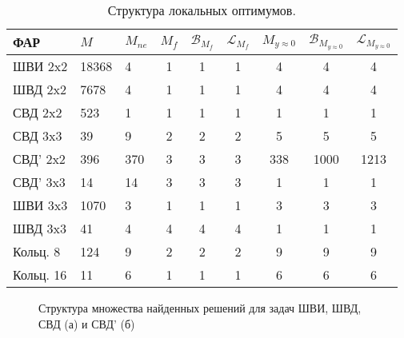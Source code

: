 \begin{table}[!h]
\centering
\begin{tabular}{|l | l l | c c c | c c c|}
    \hline
    \textbf{ФАР} & \textbf{$M$} & \textbf{$M_{ne}$} & \textbf{$M_{f}$} & \textbf{$\mathcal{B}_{M_f}$} & \textbf{$\mathcal{L}_{M_f}$} & \textbf{$M_{y\approx0}$} & \textbf{$\mathcal{B}_{M_{y\approx0}}$} & \textbf{$\mathcal{L}_{M_{y\approx0}}$}\\
    \hline
    ШВИ 2x2 & 18368 & 4 & 1 & 1 & 1 & 4 & 4 & 4\\
    ШВД 2x2 & 7678  & 4 & 1 & 1 & 1 & 4 & 4 & 4\\
    СВД 2x2  & 523  & 1 & 1 & 1 & 1 & 1 & 1 & 1\\
    СВД 3x3  & 39  & 9 & 2 & 2 & 2 & 5 & 5 & 5\\
    СВД' 2x2  & 396  & 370 & 3 & 3 & 3 & 338 & 1000 & 1213\\
    СВД' 3x3  & 14  & 14 & 3 & 3 & 3 & 1 & 1 & 1\\
    ШВИ 3x3 & 1070  & 3 & 1 & 1 & 1 & 3 & 3 & 3 \\
    ШВД 3x3 & 41  & 4 & 4 & 4 & 4 & 1 & 1 & 1 \\
    Кольц. 8 & 124  & 9 & 2 & 2 & 2 & 9 & 9 & 9\\
    Кольц. 16 & 11  & 6 & 1 & 1 & 1& 6 & 6 & 6\\
    \hline
\end{tabular}
    \caption{Структура локальных оптимумов.}
    \label{tab:structure}
\end{table}

\begin{figure}
\centering
    \begin{minipage}[h]{0.8\linewidth}
    \end{minipage}
    \begin{minipage}[h]{0.8\linewidth}
    \end{minipage}
    \vspace{0.7em}
    \caption{Структура множества найденных решений для задач ШВИ, ШВД, СВД (а) и СВД' (б)}
    \label{ris:fit_dist}
\end{figure}

